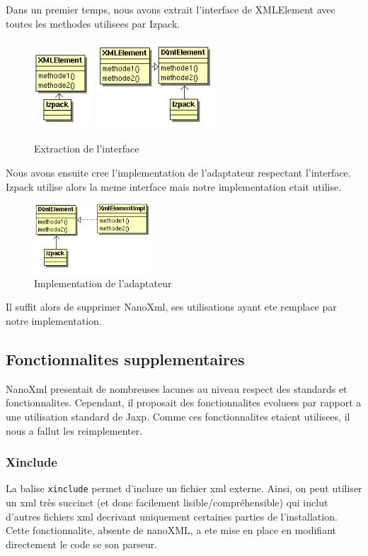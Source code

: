 Dans un premier temps, nous avons extrait l'interface de XMLElement avec toutes les methodes utilisees par Izpack.
\begin{figure}[H]
	\centering
	\includegraphics[width=0.2\textwidth]{../image/sol_casInitial.png}
	\hfil
	\includegraphics[width=0.4\textwidth]{../image/sol_extractionInterface.png}
	\caption{Extraction de l'interface}
\end{figure}
Nous avons ensuite cree l'implementation de l'adaptateur respectant l'interface. Izpack utilise alors la meme interface mais notre implementation etait utilise. 
\begin{figure}[H]
	\centering
	\includegraphics[width=0.4\textwidth]{../image/sol_implementation.png}
	\caption{Implementation de l'adaptateur}
\end{figure}
Il suffit alors de supprimer NanoXml, ses utilisations ayant ete remplace par notre implementation.
\subsection{Fonctionnalites supplementaires}
NanoXml presentait de nombreuses lacunes au niveau respect des standards et fonctionnalites. Cependant, il proposait des fonctionnalites evoluees par rapport a une utilisation standard de Jaxp. Comme ces fonctionnalites etaient utilisees, il nous a fallut les reimplementer.
\subsubsection{Xinclude}
La balise \verb|xinclude| permet d'inclure un fichier xml externe. Ainsi, on peut utiliser un xml très succinct (et donc facilement lisible/compréhensible) qui inclut d'autres fichiers xml decrivant uniquement certaines parties de l'installation. Cette fonctionnalite, absente de nanoXML, a ete mise en place en modifiant directement le code se son parseur.

